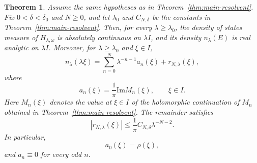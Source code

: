 \documentclass[10pt,a4paper]{amsart}
\newtheorem{thm}{Theorem}
\newcommand{\Impart}{\mathrm{Im}}
\begin{document}
\begin{thm}
\label{thm:main-dos}
Assume the same hypotheses as in Theorem~\ref{thm:main-resolvent}. Fix
$0<\delta<\delta_0$ and $N\ge0$, and let $\lambda_0$ and
$C_{N,\delta}$ be the constants in Theorem~\ref{thm:main-resolvent}.
Then, for every $\lambda\ge\lambda_0$, the density of states measure of
$H_{\lambda,\omega}$ is absolutely continuous on $\lambda I$, and its
density $n_\lambda(E)$ is real analytic on $\lambda I$. Moreover, for
$\lambda\ge\lambda_0$ and $\xi\in I$,
\begin{equation}
\label{eq:main-dos-expansion}
n_\lambda(\lambda\xi)
=
\sum_{n=0}^{N}\lambda^{-n-1}a_n(\xi)
+
r_{N,\lambda}(\xi),
\end{equation}
where
\begin{equation}
\label{eq:an-def}
a_n(\xi)
=
\frac{1}{\pi}\Impart M_n(\xi),
\qquad
\xi\in I.
\end{equation}
Here $M_n(\xi)$ denotes the value at $\xi\in I$ of the holomorphic
continuation of $M_n$ obtained in Theorem~\ref{thm:main-resolvent}.
The remainder satisfies
\begin{equation}
\label{eq:rn-bound}
|r_{N,\lambda}(\xi)|
\le
\frac{1}{\pi}C_{N,\delta}\lambda^{-N-2}.
\end{equation}
In particular,
\begin{equation}
\label{eq:a0-rho}
a_0(\xi)=\rho(\xi),
\end{equation}
and $a_n\equiv0$ for every odd $n$.
\end{thm}
\end{document}
